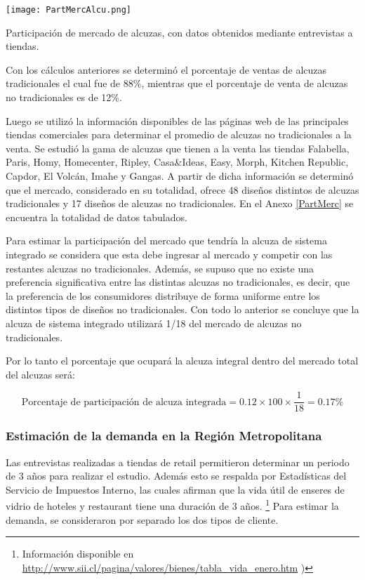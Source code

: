 \begin{table}[H]
\centering
\texttt{[image: PartMercAlcu.png]}
\caption{Participación de mercado de alcuzas, con datos obtenidos mediante entrevistas a tiendas.}
\label{PartMercAlcu}
\end{table}

Con los cálculos anteriores se determinó el porcentaje de ventas de alcuzas tradicionales el cual fue de 88\%, mientras que el porcentaje de venta de alcuzas no tradicionales es de 12\%.

Luego se utilizó la información disponibles de las páginas web de las principales tiendas  comerciales para determinar el promedio de alcuzas no tradicionales a la venta. Se estudió la gama de alcuzas que tienen a la venta las tiendas Falabella, Paris, Homy, Homecenter, Ripley, Casa\&Ideas, Easy, Morph, Kitchen Republic, Capdor, El Volcán, Imahe y Gangas. A partir de dicha información se determinó que el mercado, considerado en su totalidad, ofrece 48 diseños distintos de alcuzas tradicionales y 17 diseños de alcuzas no tradicionales. En el Anexo \ref{PartMerc} se encuentra la totalidad de datos tabulados.

Para estimar la participación del mercado que tendría la alcuza de sistema integrado se considera que esta debe ingresar al mercado y competir con las restantes alcuzas no tradicionales. Además, se supuso que no existe una preferencia significativa entre las distintas alcuzas no tradicionales, es decir, que la preferencia de los consumidores distribuye de forma uniforme entre los distintos tipos de diseños no tradicionales. Con todo lo anterior se concluye que la alcuza de sistema integrado utilizará 1/18  del mercado de alcuzas no tradicionales.

Por lo tanto el porcentaje que ocupará la alcuza integral dentro del mercado total del alcuzas será:

\begin{equation*}
\text{Porcentaje de participación de alcuza integrada} = 0.12 \times 100 \times \frac{1}{18} = 0.17\%
\end{equation*}

\subsubsection{Estimación de la demanda en la Región Metropolitana}

Las entrevistas realizadas a tiendas de retail permitieron determinar un periodo de 3 años para realizar el estudio. Además esto  se respalda por Estadísticas del Servicio de Impuestos Interno, las cuales afirman que la vida útil de enseres de vidrio de hoteles y restaurant tiene una duración de 3 años. \footnote{
Información disponible en \url{http://www.sii.cl/pagina/valores/bienes/tabla_vida_enero.htm} )
}
Para estimar la demanda, se consideraron por separado los dos tipos de cliente.
